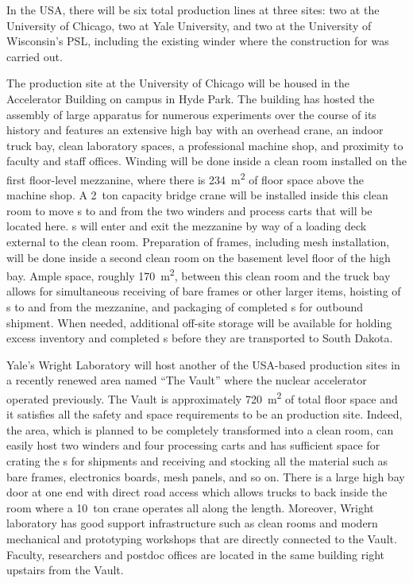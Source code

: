 In the USA, there will be six total production lines at three sites: two at the University of Chicago, two at Yale University, and two at the University of Wisconsin's PSL, including the existing winder where the construction for  was carried out. 

The  production site at the University of Chicago will be housed in the Accelerator Building on campus in Hyde Park.  The building has hosted the assembly of large apparatus for numerous experiments over the course of its history and features an extensive high bay with an overhead crane, an indoor truck bay, clean laboratory spaces, a professional machine shop, and proximity to faculty and staff offices.  Winding will be done inside a clean room installed on the first floor-level mezzanine, where there is \SI{234}{m^2} of floor space above the machine shop.  A \SI{2}{ton} capacity bridge crane will be installed inside this clean room to move s to and from the two winders and process carts that will be located here.  s will enter and exit the mezzanine by way of a loading deck external to the clean room.  Preparation of  frames, including mesh installation, will be done inside a second clean room on the basement level floor of the high bay.  Ample space, roughly \SI{170}{m^2}, between this clean room and the truck bay allows for simultaneous receiving of bare frames or other larger items, hoisting of s to and from the mezzanine, and packaging of completed s for outbound shipment.  When needed, additional off-site storage will be available for holding excess inventory and completed s before they are transported to South Dakota.

Yale's Wright Laboratory will host another of the USA-based  production sites in a recently renewed area named ``The Vault'' where the nuclear accelerator operated previously.  The Vault is approximately \SI{720}{m^2} of total floor space and it satisfies all the safety and space requirements to be an  production site. 
Indeed, the area, which is planned to be completely transformed into a clean room, can easily host two winders and four processing carts and has sufficient space for crating the s for shipments and receiving and stocking all the material such as bare frames, electronics boards, mesh panels, and so on. There is a large high bay door at one end with direct road access which allows trucks to back inside the room where a \SI{10}{ton} crane operates all along the length.  Moreover, Wright laboratory has good support infrastructure such as clean rooms and modern mechanical and prototyping workshops that are directly connected to the Vault. Faculty, researchers and postdoc offices are located in the same building right upstairs from the Vault.

